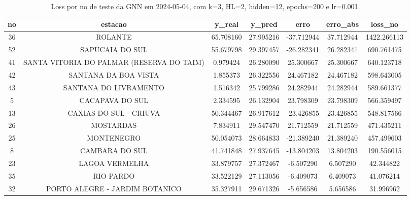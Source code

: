 \begin{table}[h]
\centering
\caption{Loss por no de teste da GNN em 2024-05-04, com k=3, HL=2, hidden=12, epochs=200 e lr=0.001.}
\label{tab:gnn_loss_k3_hl2_h12_e200_d20240504}
\begin{tabular}{ccccccc}
\toprule
no & estacao & y\_real & y\_pred & erro & erro\_abs & loss\_no \\
\midrule
36 & ROLANTE & 65.708160 & 27.995216 & -37.712944 & 37.712944 & 1422.266113 \\
52 & SAPUCAIA DO SUL & 55.679798 & 29.397457 & -26.282341 & 26.282341 & 690.761475 \\
41 & SANTA VITORIA DO PALMAR (RESERVA DO TAIM) & 0.979424 & 26.280090 & 25.300667 & 25.300667 & 640.123718 \\
42 & SANTANA DA BOA VISTA & 1.855373 & 26.322556 & 24.467182 & 24.467182 & 598.643005 \\
43 & SANTANA DO LIVRAMENTO & 1.516342 & 25.799286 & 24.282944 & 24.282944 & 589.661377 \\
5 & CACAPAVA DO SUL & 2.334595 & 26.132904 & 23.798309 & 23.798309 & 566.359497 \\
13 & CAXIAS DO SUL - CRIUVA & 50.344467 & 26.917612 & -23.426855 & 23.426855 & 548.817566 \\
26 & MOSTARDAS & 7.834911 & 29.547470 & 21.712559 & 21.712559 & 471.435211 \\
25 & MONTENEGRO & 50.054073 & 28.664833 & -21.389240 & 21.389240 & 457.499603 \\
8 & CAMBARA DO SUL & 41.741848 & 27.937645 & -13.804203 & 13.804203 & 190.556015 \\
23 & LAGOA VERMELHA & 33.879757 & 27.372467 & -6.507290 & 6.507290 & 42.344822 \\
35 & RIO PARDO & 33.522129 & 27.113056 & -6.409073 & 6.409073 & 41.076214 \\
32 & PORTO ALEGRE - JARDIM BOTANICO & 35.327911 & 29.671326 & -5.656586 & 5.656586 & 31.996962 \\
\bottomrule
\end{tabular}
\end{table}
